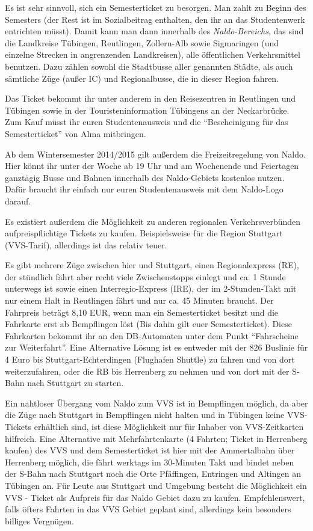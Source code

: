 Es ist sehr sinnvoll, sich ein Semesterticket zu besorgen.  Man zahlt
  zu Beginn des Semesters \Ticketpreis (der Rest ist im Sozialbeitrag
  enthalten, den ihr an das Studentenwerk entrichten müsst).  Damit
  kann man dann innerhalb des \emph{Naldo-Bereichs}, das sind die
  Landkreise Tübingen, Reutlingen, Zollern-Alb sowie Sigmaringen
  (und einzelne Strecken in angrenzenden Landkreisen), alle
  öffentlichen Verkehrsmittel benutzen. Dazu zählen sowohl die
  Stadtbusse aller genannten Städte, als auch sämtliche Züge (außer IC) und
  Regionalbusse, die in dieser Region fahren.

Das Ticket bekommt ihr unter anderem in den Reisezentren in Reutlingen und Tübingen
  sowie in der Touristeninformation Tübingens an der Neckarbrücke.
  Zum Kauf müsst ihr euren Studentenausweis und die "`Bescheinigung für das Semesterticket"' von Alma mitbringen.

Ab dem Wintersemester 2014/2015 gilt außerdem die Freizeitregelung von Naldo. Hier könnt ihr unter der Woche ab 19 Uhr und am Wochenende und Feiertagen ganztägig Busse und Bahnen innerhalb des Naldo-Gebiets kostenlos nutzen. Dafür braucht ihr einfach nur euren Studentenausweis mit dem Naldo-Logo darauf.

Es existiert außerdem die Möglichkeit zu anderen regionalen Verkehrsverbünden aufpreispflichtige Tickets zu kaufen.
Beispielsweise für die Region Stuttgart (VVS-Tarif), allerdings ist das relativ teuer.

Es gibt mehrere Züge zwischen hier und Stuttgart, einen
  Regionalexpress (RE), der stündlich fährt aber recht viele
  Zwischenstopps einlegt und ca. 1 Stunde unterwegs ist sowie einen
  Interregio-Express (IRE), der im 2-Stunden-Takt mit nur einem Halt
  in Reutlingen fährt und nur ca. 45 Minuten braucht.
  Der Fahrpreis beträgt 8,10 EUR, wenn man ein Semesterticket
  besitzt und die Fahrkarte erst ab Bempflingen löst (Bis dahin gilt euer Semesterticket).
  Diese Fahrkarten bekommt ihr an den DB-Automaten unter dem Punkt "`Fahrscheine zur Weiterfahrt"'.
Eine Alternative Lösung ist es entweder mit der 826 Buslinie für 4 Euro bis Stuttgart-Echterdingen (Flughafen Shuttle) zu fahren und von dort weiterzufahren, oder die RB bis Herrenberg zu nehmen und von dort mit der S-Bahn nach Stuttgart zu starten.


Ein nahtloser Übergang vom Naldo zum VVS ist in Bempflingen
  möglich, da aber die Züge nach Stuttgart in Bempflingen nicht halten und in
  Tübingen keine VVS-Tickets erhältlich sind, ist diese Möglichkeit nur für
  Inhaber von VVS-Zeitkarten hilfreich. Eine Alternative mit Mehrfahrtenkarte
  (4 Fahrten; Ticket in Herrenberg kaufen) des VVS und dem Semesterticket
  ist hier mit der Ammertalbahn
  über Herrenberg möglich, die fährt werktags im 30-Minuten Takt und
  bindet neben der S-Bahn nach Stuttgart noch die Orte Pfäffingen, Entringen
  und Altingen an Tübingen an. Für Leute aus Stuttgart und Umgebung besteht die Möglichkeit ein VVS - Ticket als Aufpreis für das Naldo Gebiet dazu zu kaufen.
 Empfehlenswert, falls öfters Fahrten in das VVS Gebiet geplant sind, allerdings kein besonders billiges Vergnügen.

